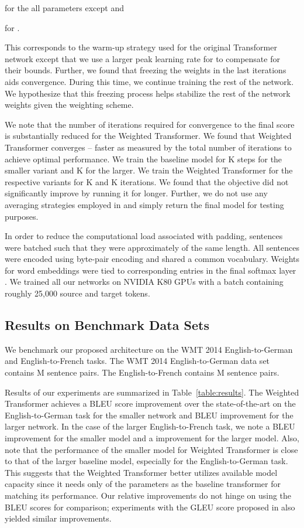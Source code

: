 \documentclass{article} \usepackage{iclr2018_conference,times}
\newcommand{\name}{Weighted Transformer\xspace}
\begin{document}
for the all parameters except  and 

for . 

This corresponds to the warm-up strategy used for the original Transformer network except that we use a larger peak learning rate for  to compensate for their bounds. Further, we found that freezing the weights  in the last  iterations aids convergence. During this time, we continue training the rest of the network. We hypothesize that this freezing process helps stabilize the rest of the network weights given the weighting scheme. 

We note that the number of iterations required for convergence to the final score is substantially reduced for the \name. We found that \name converges -- faster as measured by the total number of iterations to achieve optimal performance. We train the baseline model for K steps for the smaller variant and K for the larger. We train the \name for the respective variants for K and K iterations. We found that the objective did not significantly improve by running it for longer. Further, we do not use any averaging strategies employed in \citet{vaswani2017attention} and simply return the final model for testing purposes. 

In order to reduce the computational load associated with padding, sentences were batched such that they were approximately of the same length. All sentences were encoded using byte-pair encoding \citep{sennrich2015neural} and shared a common vocabulary. Weights for word embeddings were tied to corresponding entries in the final softmax layer \citep{inan2016tying,press2016using}. We trained all our networks on NVIDIA K80 GPUs with a batch containing roughly 25,000 source and target tokens. 

\subsection{Results on Benchmark Data Sets}

We benchmark our proposed architecture on the WMT 2014 English-to-German and English-to-French tasks. The WMT 2014 English-to-German data set contains M sentence pairs. The English-to-French contains M sentence pairs. 

Results of our experiments are summarized in Table~\ref{table:results}. The \name achieves a  BLEU score improvement over the state-of-the-art on the English-to-German task for the smaller network and  BLEU improvement for the larger network. In the case of the larger English-to-French task, we note a  BLEU improvement for the smaller model and a  improvement for the larger model. Also, note that the performance of the smaller model for \name is close to that of the larger baseline model, especially for the English-to-German task. This suggests that the \name better utilizes available model capacity since it needs only  of the parameters as the baseline transformer for matching its performance. Our relative improvements do not hinge on using the BLEU scores for comparison; experiments with the GLEU score proposed in \citet{wu2016google} also yielded similar improvements. 
\end{document}
